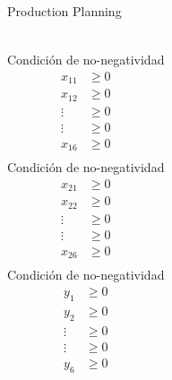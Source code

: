 \begin{frameExample}{Production Planning}{}
{\begin{columns}[t]
\begin{align*}
\end{align*}
Condición de no-negatividad
\begin{align*}
  x_{11} &\geq 0\\
  x_{12} &\geq 0\\
  \vdots &\geq 0\\
  \vdots &\geq 0\\
  x_{16} &\geq 0\\
  \end{align*}
  Condición de no-negatividad
\begin{align*}
  x_{21} &\geq 0\\
  x_{22} &\geq 0\\
  \vdots &\geq 0\\
  \vdots &\geq 0\\
  x_{26} &\geq 0\\
\end{align*}
Condición de no-negatividad
\begin{align*}
  y_{1} &\geq 0\\
  y_{2} &\geq 0\\
  \vdots &\geq 0\\
  \vdots &\geq 0\\
  y_{6} &\geq 0\\
  \end{align*}
    \end{columns}    
  }%
\end{frameExample}




